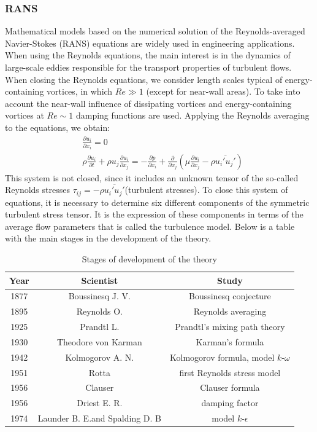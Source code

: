 \subsubsection{RANS}
	Mathematical models based on the numerical solution of the Reynolds-averaged Navier-Stokes (RANS) equations are widely used in engineering applications. When using the Reynolds equations, the main interest is in the dynamics of large-scale eddies responsible for the transport properties of turbulent flows. When closing the Reynolds equations, we consider length scales typical of energy-containing vortices, in which $Re\gg1$ (except for near-wall areas). To take into account the near-wall influence of dissipating vortices and energy-containing vortices at $Re\sim1$ damping functions are used. Applying the Reynolds averaging to the equations, we obtain:
	\begin{align}
		&\frac{\partial u_i}{\partial x_i} = 0 \nonumber\\
		&\rho\frac{\partial u_i}{\partial t} + \rho u_j \frac{\partial u_i}{\partial x_j} = - \frac{\partial p}{\partial x_i} + \frac{\partial}{\partial x_j}(\mu\frac{\partial u_i}{\partial x_j} - \rho\overline{u_i' u_j'})
	\end{align}
	This system is not closed, since it includes an unknown tensor of the so-called Reynolds stresses $\tau_{ij} = -\rho\overline{u_i' u_j'}$(turbulent stresses). To close this system of equations, it is necessary to determine six different components of the symmetric turbulent stress tensor. It is the expression of these components in terms of the average flow parameters that is called the turbulence model. Below is a table with the main stages in the development of the theory.
	
	\begin{table}[H]
		\begin{center}
			\begin{tabular}{|c|c|c|}
				\hline
				Year & Scientist & Study\\
				\hline
				1877 & Boussinesq J. V. & Boussinesq conjecture\\
				\hline
				1895 & Reynolds O. & Reynolds averaging\\
				\hline
				1925 & Prandtl L. & Prandtl's mixing path theory\\
				\hline
				1930 & Theodore von Karman & Karman's formula\\
				\hline
				1942 & Kolmogorov A. N. & Kolmogorov formula, model $k$-$\omega$\\
				\hline
				1951 & Rotta & first Reynolds stress model\\
				\hline
				1956 & Clauser & Clauser formula\\
				\hline
				1956 & Driest E. R. & damping factor\\
				\hline
				1974 & Launder B. E.and Spalding D. B & model $k$-$\epsilon$\\
				\hline
			\end{tabular}
		\end{center}
		\caption{\footnotesize{Stages of development of the theory}}
	\end{table}
	
